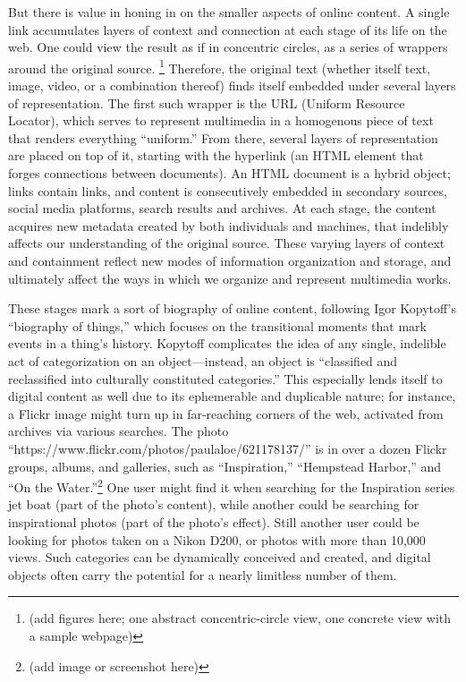 
But there is value in honing in on the smaller aspects of online content. A single link accumulates layers of context and connection at each stage of its life on the web. One could view the result as if in concentric circles, as a series of wrappers around the original source. \footnote{(add figures here; one abstract concentric-circle view, one concrete view with a sample webpage)} Therefore, the original text (whether itself text, image, video, or a combination thereof) finds itself embedded under several layers of representation. The first such wrapper is the URL (Uniform Resource Locator), which serves to represent multimedia in a homogenous piece of text that renders everything ``uniform.'' From there, several layers of representation are placed on top of it, starting with the hyperlink (an HTML element that forges connections between documents). An HTML document is a hybrid object; links contain links, and content is consecutively embedded in secondary sources, social media platforms, search results and archives. At each stage, the content acquires new metadata created by both individuals and machines, that indelibly affects our understanding of the original source. These varying layers of context and containment reflect new modes of information organization and storage, and ultimately affect the ways in which we organize and represent multimedia works.

These stages mark a sort of biography of online content, following Igor Kopytoff's ``biography of things,'' which focuses on the transitional moments that mark events in a thing's history.  Kopytoff complicates the idea of any single, indelible act of categorization on an object---instead, an object is ``classified and reclassified into culturally constituted categories.''\autocite{appadurai_cultural_1986} This especially lends itself to digital content as well due to its ephemerable and duplicable nature; for instance, a Flickr image might turn up in far-reaching corners of the web, activated from archives via various searches. The photo ``https://www.flickr.com/photos/paulaloe/621178137/'' is in over a dozen Flickr groups, albums, and galleries, such as ``Inspiration,'' ``Hempstead Harbor,'' and ``On the Water.''\footnote{(add image or screenshot here)} One user might find it when searching for the Inspiration series jet boat (part of the photo's content), while another could be searching for inspirational photos (part of the photo's effect). Still another user could be looking for photos taken on a Nikon D200, or photos with more than 10,000 views. Such categories can be dynamically conceived and created, and digital objects often carry the potential for a nearly limitless number of them.

